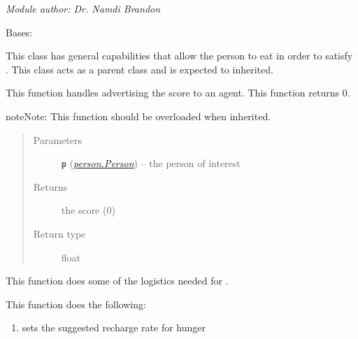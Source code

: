 \documentclass[letterpaper,10pt,english]{sphinxmanual}
\begin{document}
\emph{Module author: Dr. Namdi Brandon}

\begin{fulllineitems}
\label{eat:eat.Eat}
Bases: {\hyperref[activity:activity.Activity]{\emph{}}}

This class has general capabilities that allow the person to eat in order to satisfy {\hyperref[hunger:hunger.Hunger]{\emph{}}}.     This class acts as a parent class and is expected to inherited.

\begin{fulllineitems}
\label{eat:eat.Eat.advertise}
This function handles advertising the score to an agent. This function returns 0.

\begin{notice}{note}{Note:}
This function should be overloaded when inherited.
\end{notice}
\begin{quote}\begin{description}
\item[{Parameters}] \leavevmode
\textbf{\texttt{p}} ({\hyperref[person:person.Person]{\emph{\emph{person.Person}}}}) -- the person of interest

\item[{Returns}] \leavevmode
the score (0)

\item[{Return type}] \leavevmode
float

\end{description}\end{quote}

\end{fulllineitems}


\begin{fulllineitems}
\label{eat:eat.Eat.advertise_help}
This function does some of the logistics needed for {\hyperref[eat:eat.Eat.advertise]{\emph{}}}.

This function does the following:
\begin{enumerate}
\item {} 
sets the suggested recharge rate for hunger


\end{enumerate}
\end{fulllineitems}
\end{fulllineitems}
\end{document}
